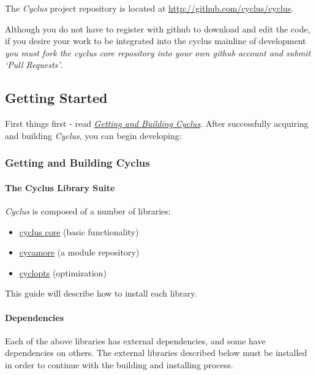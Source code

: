 \documentclass[letterpaper,10pt,english]{sphinxmanual}
\begin{document}
The \emph{Cyclus} project repository is located at
\href{http://github.com/cyclus/cyclus}{http://github.com/cyclus/cyclus}.

Although you do not have to register with github to
download and edit the code, if you desire your work to be integrated into the
cyclus mainline of development \emph{you must fork the cyclus core repository into
your own github account and submit `Pull Requests'}.


\subsection{Getting Started}
\label{devdoc/main:getting-started}
First things first - read {\hyperref[devdoc/get_and_build::doc]{\emph{Getting and Building Cyclus}}}.  After
successfully acquiring and building \emph{Cyclus}, you can begin developing:


\subsubsection{Getting and Building Cyclus}
\label{devdoc/get_and_build:getting-and-building-cyclus}\label{devdoc/get_and_build::doc}

\paragraph{The Cyclus Library Suite}
\label{devdoc/get_and_build:the-cyclus-library-suite}
\emph{Cyclus} is composed of a number of libraries:
\begin{itemize}
\item {} 
\href{https://github.com/cyclus/cyclus}{cyclus core} (basic functionality)

\item {} 
\href{https://github.com/cyclus/cycamore}{cycamore} (a module repository)

\item {} 
\href{https://github.com/cyclus/cyclopts}{cyclopts} (optimization)

\end{itemize}

This guide will describe how to install each library.


\paragraph{Dependencies}
\label{devdoc/get_and_build:dependencies}
Each of the above libraries has external dependencies, and some have
dependencies on others. The external libraries described below must
be installed in order to continue with the building and installing
process.
\end{document}
